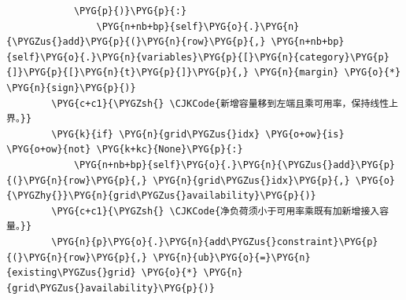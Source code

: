 \begin{Verbatim}
            \PYG{p}{)}\PYG{p}{:}
                \PYG{n+nb+bp}{self}\PYG{o}{.}\PYG{n}{\PYGZus{}add}\PYG{p}{(}\PYG{n}{row}\PYG{p}{,} \PYG{n+nb+bp}{self}\PYG{o}{.}\PYG{n}{variables}\PYG{p}{[}\PYG{n}{category}\PYG{p}{]}\PYG{p}{[}\PYG{n}{t}\PYG{p}{]}\PYG{p}{,} \PYG{n}{margin} \PYG{o}{*} \PYG{n}{sign}\PYG{p}{)}
        \PYG{c+c1}{\PYGZsh{} \CJKCode{新增容量移到左端且乘可用率，保持线性上界。}}
        \PYG{k}{if} \PYG{n}{grid\PYGZus{}idx} \PYG{o+ow}{is} \PYG{o+ow}{not} \PYG{k+kc}{None}\PYG{p}{:}
            \PYG{n+nb+bp}{self}\PYG{o}{.}\PYG{n}{\PYGZus{}add}\PYG{p}{(}\PYG{n}{row}\PYG{p}{,} \PYG{n}{grid\PYGZus{}idx}\PYG{p}{,} \PYG{o}{\PYGZhy{}}\PYG{n}{grid\PYGZus{}availability}\PYG{p}{)}
        \PYG{c+c1}{\PYGZsh{} \CJKCode{净负荷须小于可用率乘既有加新增接入容量。}}
        \PYG{n}{p}\PYG{o}{.}\PYG{n}{add\PYGZus{}constraint}\PYG{p}{(}\PYG{n}{row}\PYG{p}{,} \PYG{n}{ub}\PYG{o}{=}\PYG{n}{existing\PYGZus{}grid} \PYG{o}{*} \PYG{n}{grid\PYGZus{}availability}\PYG{p}{)}


\end{Verbatim}
